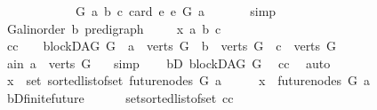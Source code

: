 \begin{isabellebody}
\ \ \ \ \ \ \ \ \ \ \ \ {\isasymlambda}{\isacharparenleft}{\kern0pt}G{\isacharcomma}{\kern0pt}\ a{\isacharcomma}{\kern0pt}\ b{\isacharcomma}{\kern0pt}\ c{\isacharparenright}{\kern0pt}{\isachardot}{\kern0pt}\ card\ {\isacharbraceleft}{\kern0pt}e{\isachardot}{\kern0pt}\ e\ {\isasymrightarrow}\isactrlsup {\isacharasterisk}{\kern0pt}\isactrlbsub G\isactrlesub \ a{\isacharbraceright}{\kern0pt}{\isacharbrackright}{\kern0pt}{\isachardoublequoteclose}\ \isanewline
\ \ \ \ \isamarkupfalse%
\ simp\isanewline
{}\isamarkupfalse%
\ \isanewline
\ \ \isamarkupfalse%
\ G{\isacharcolon}{\kern0pt}{\isacharcolon}{\kern0pt}{\isachardoublequoteopen}{\isacharparenleft}{\kern0pt}{\isacharprime}{\kern0pt}a{\isacharcolon}{\kern0pt}{\isacharcolon}{\kern0pt}linorder{\isacharcomma}{\kern0pt}\ {\isacharprime}{\kern0pt}b{\isacharparenright}{\kern0pt}\ pre{\isacharunderscore}{\kern0pt}digraph{\isachardoublequoteclose}\ \isanewline
\ \ \isamarkupfalse%
\ x\ a\ b\ c\isanewline
\ \ \isamarkupfalse%
\ cc{\isacharcolon}{\kern0pt}\ {\isachardoublequoteopen}\ {\isasymnot}\ {\isacharparenleft}{\kern0pt}{\isasymnot}\ blockDAG\ G\ {\isasymor}\ a\ {\isasymnotin}\ verts\ G\ {\isasymor}\ b\ {\isasymnotin}\ verts\ G\ {\isasymor}\ c\ {\isasymnotin}\ verts\ G{\isacharparenright}{\kern0pt}{\isachardoublequoteclose}\isanewline
\ \ \isamarkupfalse%
\ \isamarkupfalse%
\ a{\isacharunderscore}{\kern0pt}in{\isacharcolon}{\kern0pt}\ {\isachardoublequoteopen}a\ {\isasymin}\ verts\ G{\isachardoublequoteclose}\ \ \isamarkupfalse%
\ simp\isanewline
\ \ \isamarkupfalse%
\ bD{\isacharcolon}{\kern0pt}\ blockDAG\ G\ \isamarkupfalse%
\ cc\ \isamarkupfalse%
\ auto\isanewline
\ \ \isamarkupfalse%
\ {\isachardoublequoteopen}x\ {\isasymin}\ set\ {\isacharparenleft}{\kern0pt}sorted{\isacharunderscore}{\kern0pt}list{\isacharunderscore}{\kern0pt}of{\isacharunderscore}{\kern0pt}set\ {\isacharparenleft}{\kern0pt}future{\isacharunderscore}{\kern0pt}nodes\ G\ a{\isacharparenright}{\kern0pt}{\isacharparenright}{\kern0pt}{\isachardoublequoteclose}\isanewline
\ \ \isamarkupfalse%
\ \isamarkupfalse%
\ {\isachardoublequoteopen}x\ {\isasymin}\ future{\isacharunderscore}{\kern0pt}nodes\ G\ a{\isachardoublequoteclose}\ \isamarkupfalse%
\ bD{\isachardot}{\kern0pt}finite{\isacharunderscore}{\kern0pt}future\isanewline
\ \ \ \ \ \ set{\isacharunderscore}{\kern0pt}sorted{\isacharunderscore}{\kern0pt}list{\isacharunderscore}{\kern0pt}of{\isacharunderscore}{\kern0pt}set\ cc\isanewline

\end{isabellebody}

